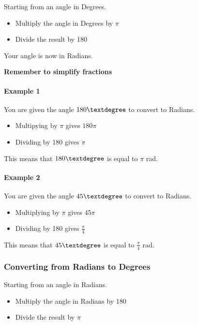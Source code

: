 \documentclass[
  12pt,
  a4paper, oneside]{starmastarticle}
\let\oldparagraph\paragraph
\renewcommand{\paragraph}[1]{\oldparagraph{#1}\mbox{}}
\providecommand{\tightlist}{%
  \setlength{\itemsep}{0pt}\setlength{\parskip}{0pt}}\usepackage{longtable,booktabs,array}
\begin{document}
Starting from an angle in Degrees.

\begin{itemize}
\tightlist
\item
  Multiply the angle in Degrees by \(\pi\)
\item
  Divide the result by 180
\end{itemize}

Your angle is now in Radians.

\textbf{Remember to simplify fractions}

\hypertarget{example-1}{%
\paragraph{Example 1}\label{example-1}}

You are given the angle \(180\textdegree\) to convert to Radians.

\begin{itemize}
\tightlist
\item
  Multipying by \(\pi\) gives \(180\pi\)
\item
  Dividing by 180 gives \(\pi\)
\end{itemize}

This means that \(180\textdegree\) is equal to \(\pi\) rad.

\hypertarget{example-2}{%
\paragraph{Example 2}\label{example-2}}

You are given the angle \(45\textdegree\) to convert to Radians.

\begin{itemize}
\tightlist
\item
  Multiplying by \(\pi\) gives \(45\pi\)
\item
  Dividing by 180 gives \(\frac{\pi}{4}\)
\end{itemize}

This means that \(45\textdegree\) is equal to \(\frac{\pi}{4}\) rad.

\hypertarget{converting-from-radians-to-degrees}{%
\subsubsection{Converting from Radians to
Degrees}\label{converting-from-radians-to-degrees}}

Starting from an angle in Radians.

\begin{itemize}
\tightlist
\item
  Multiply the angle in Radians by 180
\item
  Divide the result by \(\pi\)
\end{itemize}
\end{document}
